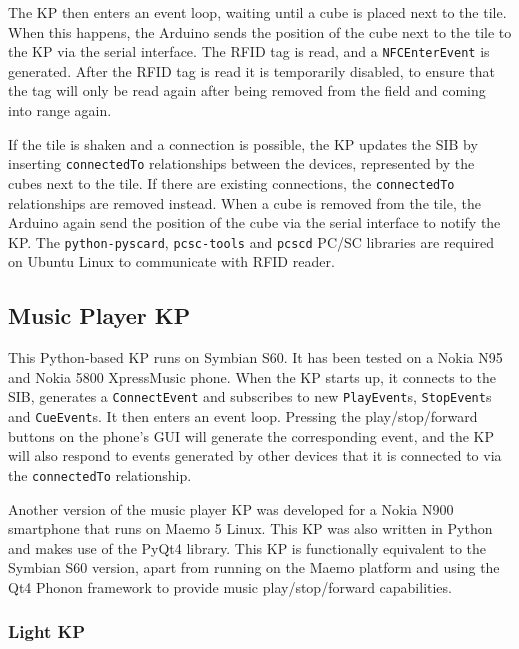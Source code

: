 The \ac{KP} then enters an event loop, waiting until a cube is placed next to the tile. When this happens, the Arduino sends the position of the cube next to the tile to the \ac{KP} via the serial interface. The \ac{RFID} tag is read, and a \texttt{NFCEnterEvent} is generated. After the \ac{RFID} tag is read it is temporarily disabled, to ensure that the tag will only be read again after being removed from the field and coming into range again.

If the tile is shaken and a connection is possible, the \ac{KP} updates the \ac{SIB} by inserting \texttt{connectedTo} relationships between the devices, represented by the cubes next to the tile. If there are existing connections, the \texttt{connectedTo} relationships are removed instead. When a cube is removed from the tile, the Arduino again send the position of the cube via the serial interface to notify the \ac{KP}. The \texttt{python-pyscard}, \texttt{pcsc-tools} and \texttt{pcscd} \ac{PC/SC} libraries are required on Ubuntu Linux to communicate with \ac{RFID} reader.

\subsection{Music Player KP}
\label{MusicPlayerKP}
This Python-based \ac{KP} runs on Symbian S60. It has been tested on a Nokia N95 and Nokia 5800 XpressMusic phone. When the \ac{KP} starts up, it connects to the \ac{SIB}, generates a \texttt{ConnectEvent} and subscribes to new \texttt{PlayEvent}s, \texttt{StopEvent}s and \texttt{CueEvent}s. It then enters an event loop. Pressing the play/stop/forward buttons on the phone's \ac{GUI} will generate the corresponding event, and the \ac{KP} will also respond to events generated by other devices that it is connected to via the \texttt{connectedTo} relationship.

Another version of the music player \ac{KP} was developed for a Nokia N900 smartphone that runs on Maemo 5 Linux. This \ac{KP} was also written in Python and makes use of the PyQt4 library. This \ac{KP} is functionally equivalent to the Symbian S60 version, apart from running on the Maemo platform and using the Qt4 Phonon framework to provide music play/stop/forward capabilities.

\subsubsection{Light KP}

